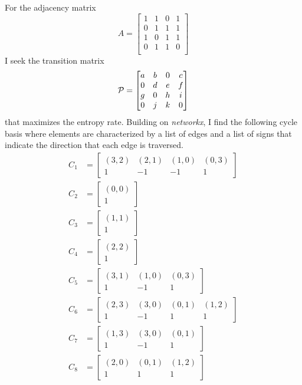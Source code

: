 \documentclass[12pt]{article} \usepackage{amsmath,amsfonts}
\newcommand{\T}{{\cal P}}
\begin{document}
For the adjacency matrix
\begin{equation*}
  A =
  \begin{bmatrix}
        1 & 1 & 0 & 1 \\
        0 & 1 & 1 & 1 \\
        1 & 0 & 1 & 1 \\
        0 & 1 & 1 & 0 \\
  \end{bmatrix}
\end{equation*}
I seek the transition matrix
\begin{equation*}
  \T =
  \begin{bmatrix}
        a & b & 0 & c \\
        0 & d & e & f \\
        g & 0 & h & i \\
        0 & j & k & 0 \\
  \end{bmatrix}
\end{equation*}
that maximizes the entropy rate.  Building on \emph{networkx}, I find
the following cycle basis where elements are characterized by a list
of edges and a list of signs that indicate the direction that each
edge is traversed.
\begin{align*}
  C_1 &=
  \begin{bmatrix}
    (3,2) & (2,1) & (1,0) & (0,3) \\
    1 & -1 & -1 & 1
  \end{bmatrix} \\
  C_2 &=  \begin{bmatrix} (0,0) \\ 1 \end{bmatrix} \\
  C_3 &=  \begin{bmatrix} (1,1) \\ 1 \end{bmatrix} \\
  C_4 &=  \begin{bmatrix} (2,2) \\ 1 \end{bmatrix} \\
  C_5 &= \begin{bmatrix}
    (3,1) & (1,0) & (0,3) \\
    1 & -1 & 1  \end{bmatrix} \\
  C_6 &= \begin{bmatrix}
    (2,3) & (3,0) & (0,1) & (1,2) \\
    1 & -1 & 1 & 1
  \end{bmatrix} \\
  C_7 &= \begin{bmatrix}
    (1,3) & (3,0) & (0,1) \\
    1 & -1 & 1  \end{bmatrix} \\
  C_8 &= \begin{bmatrix}
    (2,0) & (0,1) & (1,2) \\
    1 & 1 & 1  \end{bmatrix} \\
\end{align*}
\end{document}
